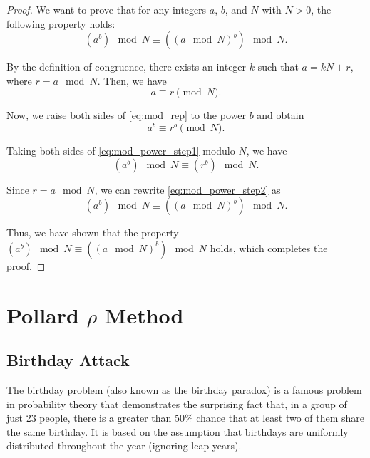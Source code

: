 \documentclass[12pt,openany]{book}
\theoremstyle{definition}
\begin{document}
	\begin{proof}
		We want to prove that for any integers $a$, $b$, and $N$ with $N > 0$, the following property holds:
		\begin{equation} \label{eq:mod_power}
			(a^b) \mod N \equiv ((a \mod N)^b) \mod N.
		\end{equation}
		
		By the definition of congruence, there exists an integer $k$ such that $a = kN + r$, where $r = a \mod N$. Then, we have
		\begin{equation} \label{eq:mod_rep}
			a \equiv r \pmod{N}.
		\end{equation}
		
		Now, we raise both sides of \eqref{eq:mod_rep} to the power $b$ and obtain
		\begin{equation} \label{eq:mod_power_step1}
			a^b \equiv r^b \pmod{N}.
		\end{equation}
		
		Taking both sides of \eqref{eq:mod_power_step1} modulo $N$, we have
		\begin{equation} \label{eq:mod_power_step2}
			(a^b) \mod N \equiv (r^b) \mod N.
		\end{equation}
		
		Since $r = a \mod N$, we can rewrite \eqref{eq:mod_power_step2} as
		\begin{equation} \label{eq:mod_power_step3}
			(a^b) \mod N \equiv ((a \mod N)^b) \mod N.
		\end{equation}
		
		Thus, we have shown that the property $(a^b) \mod N \equiv ((a \mod N)^b) \mod N$ holds, which completes the proof.
	\end{proof}
	
	
	\chapter{Pollard $\rho$ Method}
	\section{Birthday Attack}
		
	The birthday problem (also known as the birthday paradox) is a famous problem in probability theory that demonstrates the surprising fact that, in a group of just 23 people, there is a greater than 50\% chance that at least two of them share the same birthday. It is based on the assumption that birthdays are uniformly distributed throughout the year (ignoring leap years).
	
\end{document}
